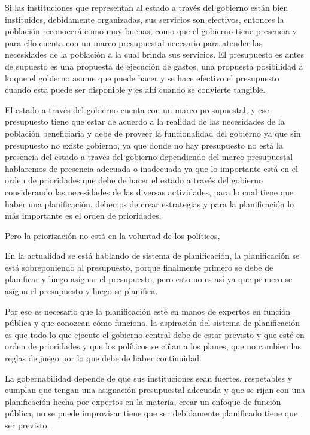 \documentclass[
  a4paper,
]{article}
\begin{document}
Si las instituciones que representan al estado a través del gobierno
están bien instituidos, debidamente organizadas, sus servicios son
efectivos, entonces la población reconocerá como muy buenas, como que el
gobierno tiene presencia y para ello cuenta con un marco presupuestal
necesario para atender las necesidades de la población a la cual brinda
sus servicios. El presupuesto es antes de supuesto es una propuesta de
ejecución de gastos, una propuesta posibilidad a lo que el gobierno
asume que puede hacer y se hace efectivo el presupuesto cuando esta
puede ser disponible y es ahí cuando se convierte tangible.

El estado a través del gobierno cuenta con un marco presupuestal, y ese
presupuesto tiene que estar de acuerdo a la realidad de las necesidades
de la población beneficiaria y debe de proveer la funcionalidad del
gobierno ya que sin presupuesto no existe gobierno, ya que donde no hay
presupuesto no está la presencia del estado a través del gobierno
dependiendo del marco presupuestal hablaremos de presencia adecuada o
inadecuada ya que lo importante está en el orden de prioridades que debe
de hacer el estado a través del gobierno considerando las necesidades de
las diversas actividades, para lo cual tiene que haber una
planificación, debemos de crear estrategias y para la planificación lo
más importante es el orden de prioridades.

Pero la priorización no está en la voluntad de los políticos,

En la actualidad se está hablando de sistema de planificación, la
planificación se está sobreponiendo al presupuesto, porque finalmente
primero se debe de planificar y luego asignar el presupuesto, pero esto
no es así ya que primero se asigna el presupuesto y luego se planifica.

Por eso es necesario que la planificación esté en manos de expertos en
función pública y que conozcan cómo funciona, la aspiración del sistema
de planificación es que todo lo que ejecute el gobierno central debe de
estar previsto y que esté en orden de prioridades y que los políticos se
ciñan a los planes, que no cambien las reglas de juego por lo que debe
de haber continuidad.

La gobernabilidad depende de que sus instituciones sean fuertes,
respetables y cumplan que tengan una asignación presupuestal adecuada y
que se rijan con una planificación hecha por expertos en la materia,
crear un enfoque de función pública, no se puede improvisar tiene que
ser debidamente planificado tiene que ser previsto.
\end{document}
